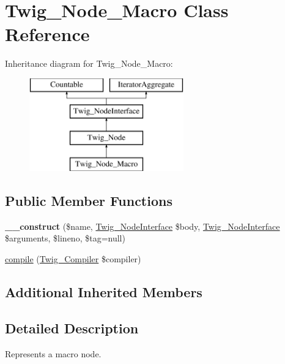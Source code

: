 \hypertarget{class_twig___node___macro}{}\section{Twig\+\_\+\+Node\+\_\+\+Macro Class Reference}
\label{class_twig___node___macro}
Inheritance diagram for Twig\+\_\+\+Node\+\_\+\+Macro\+:\begin{figure}[H]
\begin{center}
\leavevmode
\includegraphics[height=4.000000cm]{class_twig___node___macro}
\end{center}
\end{figure}
\subsection*{Public Member Functions}
\begin{DoxyCompactItemize}
\item 
\hypertarget{class_twig___node___macro_aba8a39ec362204a258fe9be110054fba}{}{\bfseries \+\_\+\+\_\+construct} (\$name, \hyperlink{interface_twig___node_interface}{Twig\+\_\+\+Node\+Interface} \$body, \hyperlink{interface_twig___node_interface}{Twig\+\_\+\+Node\+Interface} \$arguments, \$lineno, \$tag=null)\label{class_twig___node___macro_aba8a39ec362204a258fe9be110054fba}

\item 
\hyperlink{class_twig___node___macro_a4e0faa87c3fae583620b84d3607085da}{compile} (\hyperlink{class_twig___compiler}{Twig\+\_\+\+Compiler} \$compiler)
\end{DoxyCompactItemize}
\subsection*{Additional Inherited Members}


\subsection{Detailed Description}
Represents a macro node.


